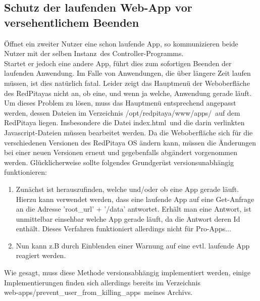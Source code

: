 \documentclass[11pt]{scrartcl}
\begin{document}



\subsection{Schutz der laufenden Web-App vor versehentlichem Beenden}
Öffnet ein zweiter Nutzer eine schon laufende App, so kommunizieren beide Nutzer mit der selben \grqq Instanz\grqq~des Controller-Programms.\\
Startet er jedoch eine andere App, führt dies zum sofortigen Beenden der laufenden Anwendung. Im Falle von Anwendungen, die über längere Zeit laufen müssen, ist dies natürlich fatal. Leider zeigt das Hauptmenü der Weboberfläche des RedPitayas nicht an, ob eine, und wenn ja welche, Anwendung gerade läuft.\\

Um dieses Problem zu lösen, muss das Hauptmenü entsprechend angepasst werden, dessen Dateien im Verzeichnis \grqq /opt/redpitaya/www/apps/\grqq~auf dem RedPitaya liegen. Insbesondere die Datei \grqq index.html\grqq~und die darin verlinkten Javascript-Dateien müssen bearbeitet werden. Da die Weboberfläche sich für die verschiedenen Versionen des RedPitaya OS ändern kann, müssen die Änderungen bei einer neuen Versionen erneut und gegebenfalls abgändert vorgenommen werden. Glücklicherweise sollte folgendes Grundgerüst versionsunabhängig funktionieren:\\
\begin{enumerate}
\item Zunächst ist herauszufinden, welche und/oder ob eine App gerade läuft. Hierzu kann verwendet werden, dass eine laufende App auf eine Get-Anfrage an die Adresse 'root\_url' + '/data' antwortet. Erhält man eine Antwort, ist unmittelbar einsehbar welche App gerade läuft, da die Antwort deren Id enthält. Dieses Verfahren funktioniert allerdings nicht für Pro-Apps...
\item Nun kann z.B durch Einblenden einer Warnung auf eine evtl. laufende App reagiert werden.
\end{enumerate} 
Wie gesagt, muss diese Methode versionsabhängig implementiert werden, einige Implementierungen finden sich allerdings bereits im Verzeichnis\\\grqq web-apps/prevent\_user\_from\_killing\_apps\grqq~meines Archivs.
\end{document}
